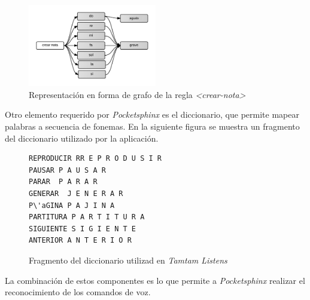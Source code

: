 \begin{figure}[H]
\centering
\includegraphics[width=0.5\textwidth]{./graphics/cmd-crear-nota.png}
\caption{Representaci\'on en forma de grafo de la regla \emph{<crear-nota>}}
\label{figure:cmd-nota}
\end{figure}


Otro elemento requerido por \emph{Pocketsphinx} es el diccionario, que permite mapear
palabras a secuencia de fonemas. En la siguiente figura se muestra un fragmento del diccionario
utilizado por la aplicaci\'on.

\begin{figure}[H]
\begin{lstlisting}
REPRODUCIR RR E P R O D U S I R
PAUSAR P A U S A R
PARAR  P A R A R
GENERAR  J E N E R A R
P\'aGINA P A J I N A
PARTITURA P A R T I T U R A
SIGUIENTE S I G I E N T E
ANTERIOR A N T E R I O R
\end{lstlisting}
\caption{Fragmento del diccionario utilizad en \emph{Tamtam Listens}}
\end{figure}

La combinaci\'on de estos componentes es lo que permite a \emph{Pocketsphinx} realizar el
reconocimiento de los comandos de voz.
